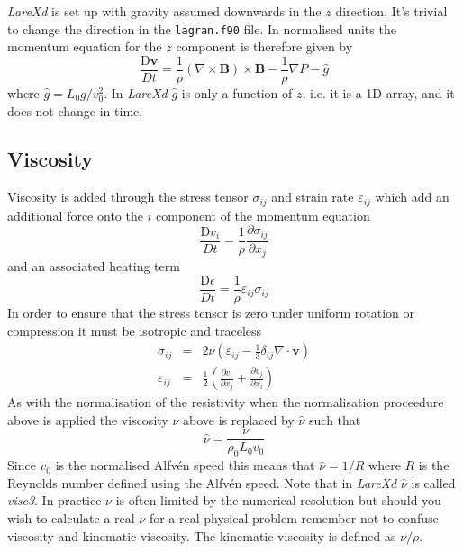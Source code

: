 \documentclass[11pt]{article}
\begin{document}
{\it LareXd} is set up with gravity assumed downwards in the $z$ direction. It's trivial to change the direction in the \texttt{lagran.f90} file. In normalised units the momentum equation for the $z$ component is therefore given by
\begin{displaymath}
 \frac{\mathrm{D}\mathbf{v}}{Dt}=\frac{1}{\rho}(\nabla\times\mathbf{B})\times\mathbf{B}
-\frac{1}{\rho}\nabla P-\hat{g}
\end{displaymath} 
where $\hat{g}=L_0 g / v_0^2$. In {\it LareXd} $\hat{g}$ is only a function of $z$, i.e. it is a 1D array, and it does not change in time.

\subsection{Viscosity}
Viscosity is added through the stress tensor $\sigma_{ij}$ and strain rate $\varepsilon_{ij}$ which add an additional force onto the $i$ component of the momentum equation
\begin{displaymath}
\frac{\mathrm{D}v_i}{Dt}=\frac{1}{\rho}\frac{\partial \sigma_{ij}}{\partial x_j}
\end{displaymath}
and an associated heating term 
\begin{displaymath}
\frac{\mathrm{D}\epsilon}{Dt}=\frac{1}{\rho}\varepsilon_{ij}\sigma_{ij}
\end{displaymath}
In order to ensure that the stress tensor is zero under uniform rotation or compression it must be isotropic and traceless
\begin{eqnarray*}
\sigma_{ij} &=& 2 \nu \left(\varepsilon_{ij}-\frac{1}{3}\delta_{ij}\nabla\cdot\mathbf{v}\right) \\
\varepsilon_{ij} &=& \frac{1}{2}\left(\frac{\partial v_i}{\partial x_j} + \frac{\partial v_j}{\partial x_i} \right)
\end{eqnarray*}
As with the normalisation of the resistivity when the normalisation proceedure above is applied the viscosity $\nu$ above is replaced by $\hat{\nu}$ such that
\begin{displaymath}
 \hat{\nu}=\frac{\nu}{\rho_0 L_0 v_0}
\end{displaymath}
Since $v_0$ is the normalised Alfv\'en speed this means that $\hat{\nu}=1/R$ where $R$ is the Reynolds number defined using the Alfv\'en speed. Note that in {\it LareXd}  $\hat{\nu}$ is called {\it visc3}. In practice $\nu$ is often limited by the numerical resolution but should you wish to calculate a real $\nu$ for a real physical problem remember not to confuse viscosity and kinematic viscosity. The kinematic viscosity is defined as $\nu/\rho$. 
\end{document}
